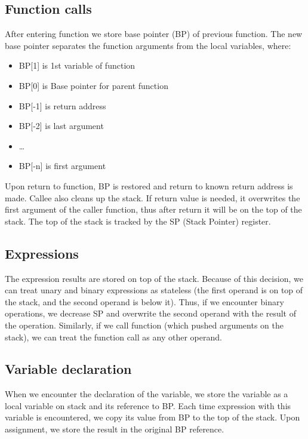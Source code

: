 \documentclass[a4paper,11pt]{article}
\begin{document}
                \subsection{Function calls}
                    After entering function we store base pointer (BP) of previous function.
                    The new base pointer separates the function arguments from the local variables, where:
                    \begin{itemize}
                        \item BP[1] is 1st variable of function
                        \item BP[0] is Base pointer for parent function
                        \item BP[-1] is return address
                        \item BP[-2] is last argument
                        \item \ldots
                        \item BP[-n] is first argument
                    \end{itemize}
                    Upon return to function, BP is restored and return to known return address is made.
                    Callee also cleans up the stack.
                    If return value is needed, it overwrites the first argument of the caller function, thus after return it will be on the top of the stack.
                    The top of the stack is tracked by the SP (Stack Pointer) register.

                \subsection{Expressions}
                    The expression results are stored on top of the stack.
                    Because of this decision, we can treat unary and binary expressions as stateless (the first operand is on top of the stack, and the second operand is below it).
                    Thus, if we encounter binary operations, we decrease SP and overwrite the second operand with the result of the operation.
                    Similarly, if we call function (which pushed arguments on the stack), we can treat the function call as any other operand.


                \subsection{Variable declaration}
                    When we encounter the declaration of the variable, we store the variable as a local variable on stack and its reference to BP.
                    Each time expression with this variable is encountered, we copy its value from BP to the top of the stack.
                    Upon assignment, we store the result in the original BP reference.
\end{document}
